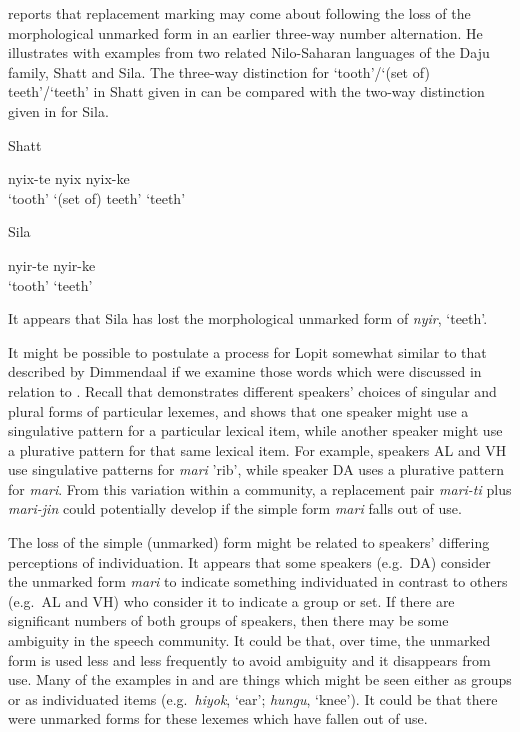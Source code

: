 \documentclass[output=paper]{langsci/langscibook}
\begin{document}
\citet[242]{Dimmendaal2000} reports that replacement marking may come about following the loss of the morphological unmarked form in an earlier three-way number alternation. He illustrates with examples from two related Nilo-Saharan languages of the Daju family, Shatt and Sila. The three-way distinction for ‘tooth’/‘(set of) teeth’/‘teeth’ in Shatt given in  can be compared with the two-way distinction given in  for Sila.

\ea\label{ex:moodie:4}
Shatt \citep[242]{Dimmendaal2000}

\gll nyix-te nyix nyix-ke \\
‘tooth’ {‘(set of) teeth’} ‘teeth’ \\
\z

\ea\label{ex:moodie:5}
Sila \citep[243]{Dimmendaal2000}

\gll nyir-te nyir-ke \\
‘tooth’ ‘teeth’ \\
\z

It appears that Sila has lost the morphological unmarked form of \textit{nyir}, ‘teeth’. 

It might be possible to postulate a process for Lopit somewhat similar to that described by Dimmendaal if we examine those words which were discussed in relation to . Recall that  demonstrates different speakers’ choices of singular and plural forms of particular lexemes, and shows that one speaker might use a singulative pattern for a particular lexical item, while another speaker might use a plurative pattern for that same lexical item. For example, speakers AL and VH use singulative patterns for \textit{mari} 'rib', while speaker DA uses a plurative pattern for \textit{mari}. From this variation within a community, a replacement pair \textit{mari-ti} plus \textit{mari-jin} could potentially develop if the simple form \textit{mari} falls out of use. 

The loss of the simple (unmarked) form might be related to speakers’ differing perceptions of individuation. It appears that some speakers (e.g.\ DA) consider the unmarked form \textit{mari }to indicate something individuated in contrast to others (e.g.\ AL and VH) who consider it to indicate a group or set. If there are significant numbers of both groups of speakers, then there may be some ambiguity in the speech community. It could be that, over time, the unmarked form is used less and less frequently to avoid ambiguity and it disappears from use. Many of the examples in  and  are things which might be seen either as groups or as individuated items (e.g.\ \textit{hiyok}, ‘ear’; \textit{hungu}, ‘knee’). It could be that there were unmarked forms for these lexemes which have fallen out of use.
\end{document}
